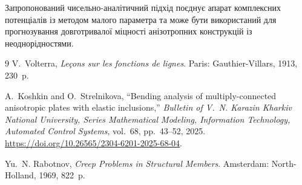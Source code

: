 Запропонований чисельно-аналітичний підхід поєднує апарат комплексних потенціалів із методом малого параметра та може бути використаний для прогнозування довготривалої міцності анізотропних конструкцій із неоднорідностями.

\begin{thebibliography}{9}
V.~Volterra, \emph{Leçons sur les fonctions de lignes}.
Paris: Gauthier-Villars, 1913, 230~p.

A.~Koshkin and O.~Strelnikova,
``Bending analysis of multiply-connected anisotropic plates with elastic inclusions,''
\emph{Bulletin of V.~N. Karazin Kharkiv National University, Series Mathematical Modeling, Information Technology, Automated Control Systems}, vol.~68, pp.~43--52, 2025.
\url{https://doi.org/10.26565/2304-6201-2025-68-04}.

Yu.~N. Rabotnov, \emph{Creep Problems in Structural Members}.
Amsterdam: North-Holland, 1969, 822~p.
\end{thebibliography}
